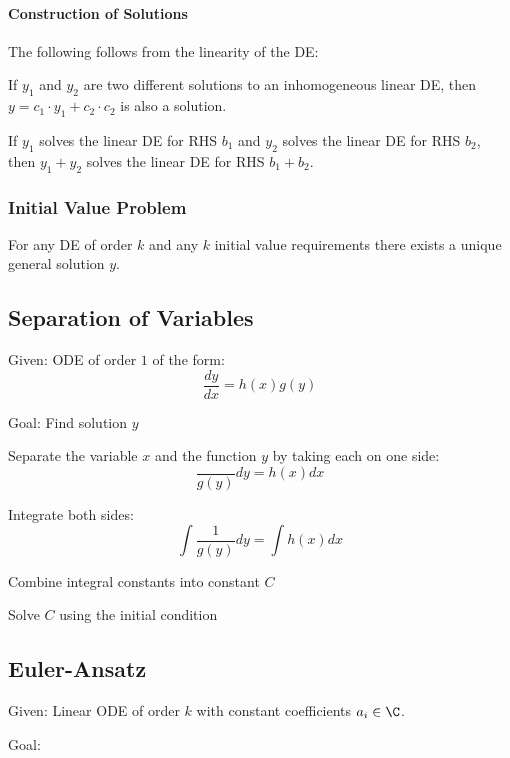 \paragraph{Construction of Solutions}
The following follows from the linearity of the DE:
\begin{compactitem}
    \item If $y_1$ and $y_2$ are two different solutions to an inhomogeneous linear DE, then $y = c_1 \cdot y_1 + c_2 \cdot c_2$ is also a solution.
    \item If $y_1$ solves the linear DE for RHS $b_1$ and $y_2$ solves the linear DE for RHS $b_2$, then $y_1 + y_2$ solves the linear DE for RHS $b_1 + b_2$.
\end{compactitem}

\subsubsection{Initial Value Problem}
For any DE of order $k$ and any $k$ initial value requirements there exists a unique general solution $y$.

\subsection{Separation of Variables}
\begin{compactdesc}
    \item[Given:] ODE of order $1$ of the form:
        $$\frac{dy}{dx} = h(x) g(y)$$
    \item[Goal:] Find solution $y$
\end{compactdesc}
\begin{compactenum}
    \item Separate the variable $x$ and the function $y$ by taking each on one side:
        $$\frac{}{g(y)}dy = h(x) dx$$
    \item Integrate both sides:
        $$\int \frac{1}{g(y)} dy = \int h(x) dx$$
    \item Combine integral constants into constant $C$
    \item Solve $C$ using the initial condition
\end{compactenum}

\subsection{Euler-Ansatz}
\begin{compactdesc}
    \item[Given:] Linear ODE of order $k$ with constant coefficients $a_i \in \C$.
    \item[Goal:] 
\end{compactdesc}

